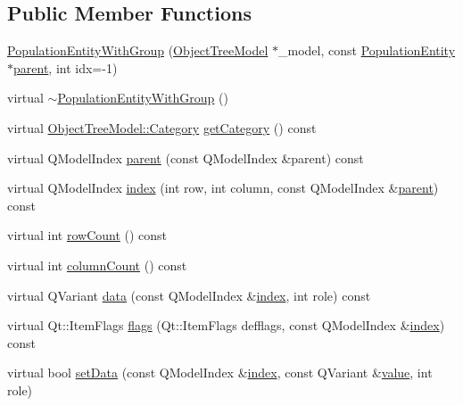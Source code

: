 \subsection*{Public Member Functions}
\begin{DoxyCompactItemize}
\item 
\mbox{\hyperlink{classobjecttree_1_1_population_entity_with_group_a6a9d2e642bfe17997eeb23cdf53223ae}{Population\+Entity\+With\+Group}} (\mbox{\hyperlink{class_object_tree_model}{Object\+Tree\+Model}} $\ast$\+\_\+model, const \mbox{\hyperlink{classobjecttree_1_1_population_entity}{Population\+Entity}} $\ast$\mbox{\hyperlink{classobjecttree_1_1_population_entity_with_group_af3100a2aa24aedfa6f77cef59736ec02}{parent}}, int idx=-\/1)
\item 
virtual \mbox{\hyperlink{classobjecttree_1_1_population_entity_with_group_a997f9c58658c1fe0529481f9fb172ca4}{$\sim$\+Population\+Entity\+With\+Group}} ()
\item 
virtual \mbox{\hyperlink{class_object_tree_model_a379e9d6b0d381853785adf62095ba4e3}{Object\+Tree\+Model\+::\+Category}} \mbox{\hyperlink{classobjecttree_1_1_population_entity_with_group_a782b6b4b4b316981bd709293b479f9b1}{get\+Category}} () const
\item 
virtual Q\+Model\+Index \mbox{\hyperlink{classobjecttree_1_1_population_entity_with_group_af3100a2aa24aedfa6f77cef59736ec02}{parent}} (const Q\+Model\+Index \&parent) const
\item 
virtual Q\+Model\+Index \mbox{\hyperlink{classobjecttree_1_1_population_entity_with_group_a244b149daf0735eca66a33b6f68773ed}{index}} (int row, int column, const Q\+Model\+Index \&\mbox{\hyperlink{classobjecttree_1_1_population_entity_with_group_af3100a2aa24aedfa6f77cef59736ec02}{parent}}) const
\item 
virtual int \mbox{\hyperlink{classobjecttree_1_1_population_entity_with_group_a7cc378022e12478bd4144670e568eeb4}{row\+Count}} () const
\item 
virtual int \mbox{\hyperlink{classobjecttree_1_1_population_entity_with_group_ad4013de31a74266b9cb7a2b4d8a083ce}{column\+Count}} () const
\item 
virtual Q\+Variant \mbox{\hyperlink{classobjecttree_1_1_population_entity_with_group_ae087908412b8df48f88104ae1f4c8bb6}{data}} (const Q\+Model\+Index \&\mbox{\hyperlink{classobjecttree_1_1_population_entity_with_group_a244b149daf0735eca66a33b6f68773ed}{index}}, int role) const
\item 
virtual Qt\+::\+Item\+Flags \mbox{\hyperlink{classobjecttree_1_1_population_entity_with_group_ae9b985951942efd8df58717d89cb9a35}{flags}} (Qt\+::\+Item\+Flags defflags, const Q\+Model\+Index \&\mbox{\hyperlink{classobjecttree_1_1_population_entity_with_group_a244b149daf0735eca66a33b6f68773ed}{index}}) const
\item 
virtual bool \mbox{\hyperlink{classobjecttree_1_1_population_entity_with_group_aaba042eeff76e900c314f165ca4222a4}{set\+Data}} (const Q\+Model\+Index \&\mbox{\hyperlink{classobjecttree_1_1_population_entity_with_group_a244b149daf0735eca66a33b6f68773ed}{index}}, const Q\+Variant \&\mbox{\hyperlink{diffusion_8cpp_a4b41795815d9f3d03abfc739e666d5da}{value}}, int role)
\end{DoxyCompactItemize}
